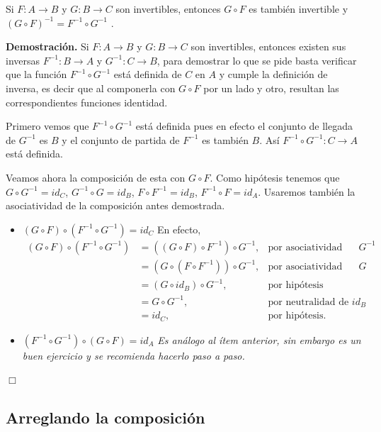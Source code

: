 \vspace{.2cm}


\begin{thm}
Si $F:A\rightarrow B$ y $G:B\rightarrow C$ son invertibles, entonces $G\circ F$ es también invertible y $(G\circ F)^{-1}=F^{-1}\circ G^{-1}$ .
\end{thm}
{\bf Demostración.}
Si $F:A\rightarrow B$ y $G:B\rightarrow C$ son invertibles, entonces existen sus inversas $F^{-1}:B\rightarrow A$ y $G^{-1}:C\rightarrow B$, para demostrar lo que se pide basta verificar que la función $F^{-1}\circ G^{-1}$ está definida de $C$ en $A$ y cumple la definición de inversa, es decir que al componerla con $G\circ F$ por un lado y otro, resultan las correspondientes funciones identidad.

Primero vemos que $F^{-1}\circ G^{-1}$ está definida pues en efecto el conjunto de llegada de $G^{-1}$ es $B$ y el conjunto de partida de $F^{-1}$ es también $B$.
Así $F^{-1}\circ G^{-1}:C\rightarrow A$ está definida.

Veamos ahora la composición de esta con $G\circ F$.
Como hipótesis tenemos que $G\circ G^{-1}=id_C$, $G^{-1}\circ G=id_B$, $F\circ F^{-1}=id_B$, $F^{-1}\circ F=id_A$.
Usaremos también la asociatividad de la composición antes demostrada.

\begin{itemize}
\item {\bf $(G\circ F)\circ (F^{-1}\circ G^{-1})=id_C$} En efecto,
\begin{align*}
(G\circ F)\circ(F^{-1}\circ G^{-1})&=((G\circ F)\circ F^{-1})\circ G^{-1},&\textrm{por asociatividad aplicada a }G^{-1}\\
&=(G\circ (F\circ F^{-1}))\circ G^{-1},&\textrm{por asociatividad aplicada a }G\\
&=(G\circ id_B)\circ G^{-1},&\textrm{por hipótesis}\\
&=G\circ G^{-1},&\textrm{por neutralidad de } id_B\\
&=id_C,&\textrm{por hipótesis.}
\end{align*}
\item {\bf $(F^{-1}\circ G^{-1})\circ(G\circ F)=id_A$} {\em Es análogo al ítem anterior, sin embargo es un buen ejercicio y se recomienda hacerlo paso a paso.}
\end{itemize}
\hfill $\Box$


\subsection{Arreglando la composición}

